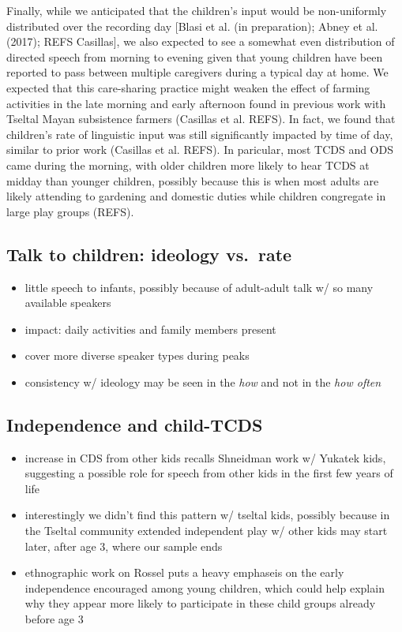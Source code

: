 \documentclass[,man,floatsintext]{apa6}
\providecommand{\tightlist}{%
  \setlength{\itemsep}{0pt}\setlength{\parskip}{0pt}}
\begin{document}
Finally, while we anticipated that the children's input would be
non-uniformly distributed over the recording day {[}Blasi et al. (in
preparation); Abney et al. (2017); REFS Casillas{]}, we also expected to
see a somewhat even distribution of directed speech from morning to
evening given that young children have been reported to pass between
multiple caregivers during a typical day at home. We expected that this
care-sharing practice might weaken the effect of farming activities in
the late morning and early afternoon found in previous work with Tseltal
Mayan subsistence farmers (Casillas et al. REFS). In fact, we found that
children's rate of linguistic input was still significantly impacted by
time of day, similar to prior work (Casillas et al. REFS). In paricular,
most TCDS and ODS came during the morning, with older children more
likely to hear TCDS at midday than younger children, possibly because
this is when most adults are likely attending to gardening and domestic
duties while children congregate in large play groups (REFS).

\subsection{Talk to children: ideology
vs.~rate}\label{talk-to-children-ideology-vs.rate}

\begin{itemize}
\tightlist
\item
  little speech to infants, possibly because of adult-adult talk w/ so
  many available speakers
\item
  impact: daily activities and family members present
\item
  cover more diverse speaker types during peaks
\item
  consistency w/ ideology may be seen in the \emph{how} and not in the
  \emph{how often}
\end{itemize}

\subsection{Independence and
child-TCDS}\label{independence-and-child-tcds}

\begin{itemize}
\tightlist
\item
  increase in CDS from other kids recalls Shneidman work w/ Yukatek
  kids, suggesting a possible role for speech from other kids in the
  first few years of life
\item
  interestingly we didn't find this pattern w/ tseltal kids, possibly
  because in the Tseltal community extended independent play w/ other
  kids may start later, after age 3, where our sample ends
\item
  ethnographic work on Rossel puts a heavy emphaseis on the early
  independence encouraged among young children, which could help explain
  why they appear more likely to participate in these child groups
  already before age 3
\end{itemize}
\end{document}
